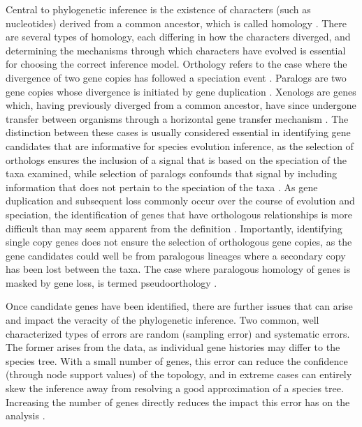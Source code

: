 \documentclass[fleqn,10pt,lineno]{wlpeerj} %
\begin{document}
Central to phylogenetic inference is the existence of characters (such as nucleotides) derived from a common ancestor, which is called homology \citep{fitch2000homology}. 
There are several types of homology, each differing in how the characters diverged, and determining the mechanisms through which characters have evolved is essential for choosing the correct inference model. 
Orthology refers to the case where the divergence of two gene copies has followed a speciation event \citep{fitch1970distinguishing}. 
Paralogs are two gene copies whose divergence is initiated by gene duplication \citep{fitch1970distinguishing}.
Xenologs are genes which, having previously diverged from a common ancestor, have since undergone transfer between organisms through a horizontal gene transfer mechanism \citep{darby2016xenolog}.
The distinction between these cases is usually considered essential in identifying gene candidates that are informative for species evolution inference, as the selection of orthologs ensures the inclusion of a signal that is based on the speciation of the taxa examined, while selection of paralogs confounds that signal by including information that does not pertain to the speciation of the taxa \citep{du2019species}. 
As gene duplication and subsequent loss commonly occur over the course of evolution and speciation, the identification of genes that have orthologous relationships is more difficult than may seem apparent from the definition \citep{gabaldon2008large}. 
Importantly, identifying single copy genes does not ensure the selection of orthologous gene copies, as the gene candidates could well be from paralogous lineages where a secondary copy has been lost between the taxa. 
The case where paralogous homology of genes is masked by gene loss, is termed pseudoorthology \citep{koonin2005orthologs}. 


Once candidate genes have been identified, there are further issues that can arise and impact the veracity of the phylogenetic inference.
Two common, well characterized types of errors are random (sampling error) and systematic errors. 
The former arises from the data, as individual gene histories may differ to the species tree. 
With a small number of genes, this error can reduce the confidence (through node support values) of the topology, and in extreme cases can entirely skew the inference away from resolving a good approximation of a species tree. 
Increasing the number of genes directly reduces the impact this error has on the analysis \citep{philippe2004phylogenomics,heath2008taxon}. 
\end{document}
